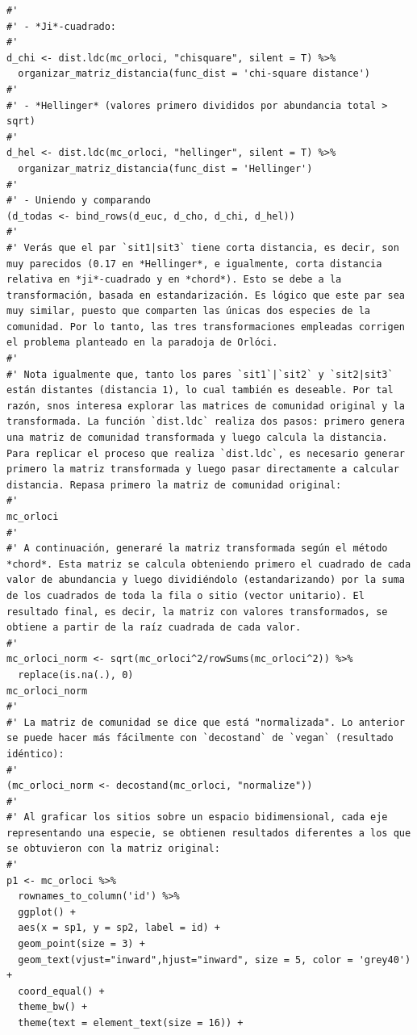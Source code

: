 \documentclass[11pt,]{article}
\begin{document}
\begin{verbatim}
#' 
#' - *Ji*-cuadrado:
#' 
d_chi <- dist.ldc(mc_orloci, "chisquare", silent = T) %>%
  organizar_matriz_distancia(func_dist = 'chi-square distance')
#' 
#' - *Hellinger* (valores primero divididos por abundancia total > sqrt)
#' 
d_hel <- dist.ldc(mc_orloci, "hellinger", silent = T) %>%
  organizar_matriz_distancia(func_dist = 'Hellinger')
#' 
#' - Uniendo y comparando
(d_todas <- bind_rows(d_euc, d_cho, d_chi, d_hel))
#' 
#' Verás que el par `sit1|sit3` tiene corta distancia, es decir, son muy parecidos (0.17 en *Hellinger*, e igualmente, corta distancia relativa en *ji*-cuadrado y en *chord*). Esto se debe a la transformación, basada en estandarización. Es lógico que este par sea muy similar, puesto que comparten las únicas dos especies de la comunidad. Por lo tanto, las tres transformaciones empleadas corrigen el problema planteado en la paradoja de Orlóci.
#' 
#' Nota igualmente que, tanto los pares `sit1`|`sit2` y `sit2|sit3` están distantes (distancia 1), lo cual también es deseable. Por tal razón, snos interesa explorar las matrices de comunidad original y la transformada. La función `dist.ldc` realiza dos pasos: primero genera una matriz de comunidad transformada y luego calcula la distancia. Para replicar el proceso que realiza `dist.ldc`, es necesario generar primero la matriz transformada y luego pasar directamente a calcular distancia. Repasa primero la matriz de comunidad original:
#' 
mc_orloci
#' 
#' A continuación, generaré la matriz transformada según el método *chord*. Esta matriz se calcula obteniendo primero el cuadrado de cada valor de abundancia y luego dividiéndolo (estandarizando) por la suma de los cuadrados de toda la fila o sitio (vector unitario). El resultado final, es decir, la matriz con valores transformados, se obtiene a partir de la raíz cuadrada de cada valor.
#' 
mc_orloci_norm <- sqrt(mc_orloci^2/rowSums(mc_orloci^2)) %>%
  replace(is.na(.), 0)
mc_orloci_norm
#' 
#' La matriz de comunidad se dice que está "normalizada". Lo anterior se puede hacer más fácilmente con `decostand` de `vegan` (resultado idéntico):
#' 
(mc_orloci_norm <- decostand(mc_orloci, "normalize"))
#' 
#' Al graficar los sitios sobre un espacio bidimensional, cada eje representando una especie, se obtienen resultados diferentes a los que se obtuvieron con la matriz original:
#' 
p1 <- mc_orloci %>%
  rownames_to_column('id') %>% 
  ggplot() +
  aes(x = sp1, y = sp2, label = id) +
  geom_point(size = 3) +
  geom_text(vjust="inward",hjust="inward", size = 5, color = 'grey40') +
  coord_equal() +
  theme_bw() +
  theme(text = element_text(size = 16)) +

\end{verbatim}
\end{document}
